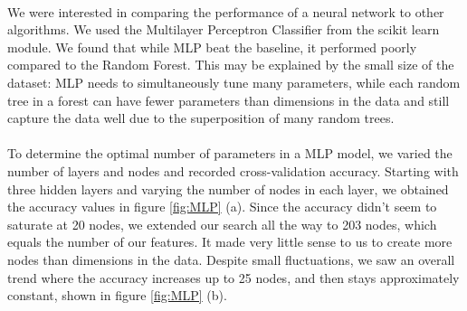 \documentclass[11pt]{article}
\begin{document}
\paragraph{}We were interested in comparing the performance of a neural network to other algorithms. We used the Multilayer Perceptron Classifier from the scikit learn module. We found that while MLP beat the baseline, it performed poorly compared to the Random Forest. This may be explained by the small size of the dataset: MLP needs to simultaneously tune many parameters, while each random tree in a forest can have fewer parameters than dimensions in the data and still capture the data well due to the superposition of many random trees.

\paragraph{}To determine the optimal number of parameters in a MLP model, we varied the number of layers and nodes and recorded cross-validation accuracy. Starting with three hidden layers and varying the number of nodes in each layer, we obtained the accuracy values in figure \ref{fig:MLP} (a). Since the accuracy didn't seem to saturate at 20 nodes, we extended our search all the way to 203 nodes, which equals the number of our features. It made very little sense to us to create more nodes than dimensions in the data. Despite small fluctuations, we saw an overall trend where the accuracy increases up to 25 nodes, and then stays approximately constant, shown in figure \ref{fig:MLP} (b). 
\end{document}
